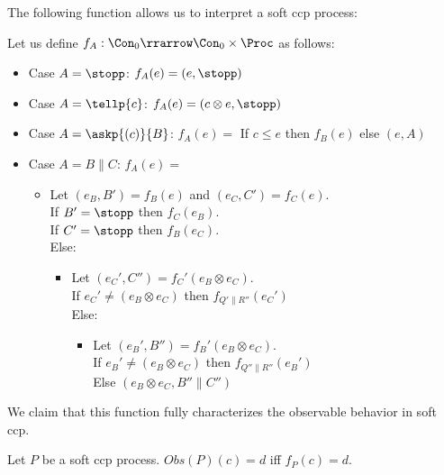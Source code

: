 \documentclass[festschrift13.tex]{subfiles}
\begin{document}
The following function allows us to interpret a soft ccp process:
\begin{definition}
Let us define $f_A: \Con_0 \rrarrow \Con_0 \times \Proc$ as follows:
\begin{itemize}
 \item Case $A = \stopp$: $f_A(e) = (e, \stopp)$
 \item Case $A = \tellp{c}$: $f_A(e) = (c \otimes e, \stopp)$
 \item Case $A = \askp{(c)}{B}$: $f_A(e) =$ If $c \leq e$ then $f_B(e)$ else $(e, A)$
 \item Case $A = B \parallel C$: $f_A(e) =$
\begin{itemize}
  \item Let $(e_B, B') = f_B(e)$ and $(e_C, C') = f_C(e)$.\\
  If $B'=\stopp$ then $f_C(e_B)$. \\
  If $C'=\stopp$ then $f_B(e_C)$. \\
  Else:
  \begin{itemize}
  \item Let $(e_C', C'') = f_C'(e_B \otimes e_C)$.\\
  If $e_C' \neq (e_B \otimes e_C)$ then $f_{Q' \parallel R''}(e_C')$\\
  Else:
     \begin{itemize}
      \item Let $(e_B', B'') = f_B'(e_B \otimes e_C)$.\\
      If $e_B' \neq (e_B \otimes e_C)$ then $f_{Q'' \parallel R''}(e_B')$\\
      Else $(e_B \otimes e_C, B'' \parallel C'')$
     \end{itemize}
  \end{itemize}
\end{itemize}
\end{itemize}
\end{definition}

We claim that this function fully characterizes the observable behavior in soft ccp.

\begin{theorem}
Let $P$ be a soft ccp process. $Obs(P)(c) = d$ iff $f_P(c) = d$.
\end{theorem}
\end{document}
